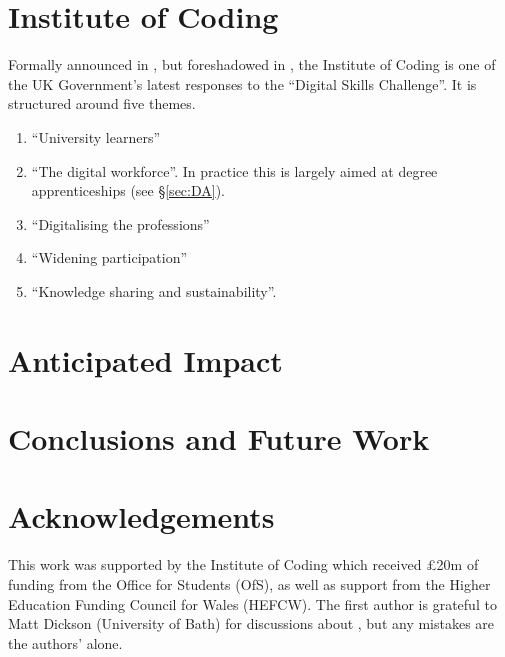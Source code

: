 \documentclass[sigconf]{acmart}
\begin{document}
\section{Institute of Coding}

Formally announced in \cite{DfE2018a}, but foreshadowed in
\cite{HMG2015a}, the Institute of Coding is one of the UK Government's latest responses to the ``Digital Skills Challenge''. It is structured around five themes.
\begin{enumerate}
\item ``University learners''
\item ``The digital workforce''. In practice this is largely aimed at degree apprenticeships (see \S\ref{sec:DA}).
\item ``Digitalising the professions''
\item ``Widening participation''
\item ``Knowledge sharing and sustainability''.
\end{enumerate}



\section{Anticipated Impact}

\section{Conclusions and Future Work}


\section{Acknowledgements}

This work was supported by the Institute of Coding which received
\pounds20m of funding from the Office for Students (OfS), as well as
support from the Higher Education Funding Council for Wales (HEFCW).
The first author is grateful to Matt Dickson (University of Bath) for
discussions about \cite{DfE2018d}, but any mistakes are the authors'
alone.



 
\end{document}
